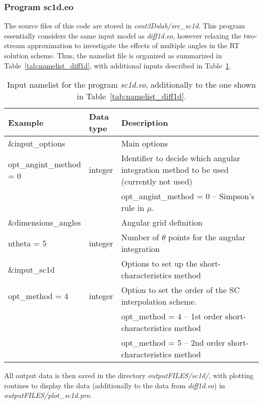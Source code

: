 \documentclass[10pt,a4paper]{article}
\begin{document}
\subsubsection{Program sc1d.eo}
The source files of this code are stored in
\textit{cont3Dslab/src\_sc1d}. This program essentially considers the
same input model as \textit{diff1d.eo}, however relaxing the
two-stream approximation to investigate the effects of multiple angles
in the RT solution scheme. Thus, the namelist file is organized as
summarized in Table~\ref{tab:namelist_diff1d}, with additional inputs
described in Table~\ref{tab:namelist_sc1d}.
%
\begin{footnotesize}
\begin{longtable}[h]{p{0.24\linewidth}p{0.07\linewidth}p{0.69\linewidth}}
\caption{\normalsize Input namelist for the program \textit{sc1d.eo}, additionally to the one shown in Table~\ref{tab:namelist_diff1d}.}
\label{tab:namelist_sc1d}
\\\hline\hline
 Example & Data type & Description \\\hline
\&input\_options & & Main options \\
opt\_angint\_method = 0 & integer & Identifier to decide which angular integration method to be used (currently not used) \\
& & opt\_angint\_method = 0 -- Simpson's rule in $\mu$. \\\hline
%
%
\&dimensions\_angles & & Angular grid definition \\
ntheta = 5 & integer & Number of $\theta$ points for the angular integration \\\hline
\&input\_sc1d & & Options to set up the short-characteristics method \\
opt\_method = 4 & integer & Option to set the order of the SC interpolation scheme. \\
& & opt\_method = 4 -- 1st order short-characteristics method \\
& & opt\_method = 5 -- 2nd order short-characteristics method \\
%
\end{longtable}
\end{footnotesize}
%
All output data is then saved in the directory \textit{outputFILES/sc1d/},
with plotting routines to display the data (additionally to the data
from \textit{diff1d.eo}) in \textit{outputFILES/plot\_sc1d.pro}.
%
%
%
\end{document}
